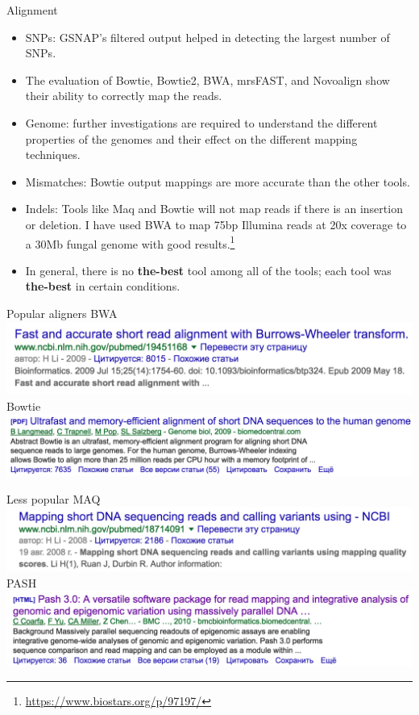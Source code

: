 \documentclass{beamer}
\begin{document}
\begin{frame}{Alignment}
\begin{itemize}
\item SNPs: GSNAP’s filtered output helped in detecting the largest number of SNPs.
\item The evaluation of Bowtie, Bowtie2, BWA, mrsFAST, and Novoalign show their ability to correctly map the reads.
\item Genome: further investigations are required to understand the different properties of the genomes and their effect on the different mapping techniques.
\item Mismatches: Bowtie output mappings are more accurate than the other tools.
\item Indels: Tools like Maq and Bowtie will not map reads if there is an insertion or deletion. I have used BWA to map 75bp Illumina reads at 20x coverage to a 30Mb fungal genome with good results.\footnote{\url{https://www.biostars.org/p/97197/}}
\item In general, there is no \textbf{the-best} tool among all of the tools; each tool was \textbf{the-best} in certain conditions.
\end{itemize}
\end{frame}

\begin{frame}{Popular aligners}
BWA\\
\includegraphics[width=\linewidth]{bwa.png}\\
Bowtie\\
\includegraphics[width=\linewidth]{bowtie.png}\\
\end{frame}

\begin{frame}{Less popular}
MAQ\\
\includegraphics[width=\linewidth]{MAQ.png}\\
PASH\\
\includegraphics[width=\linewidth]{pash.png}\\
\end{frame}
\end{document}
